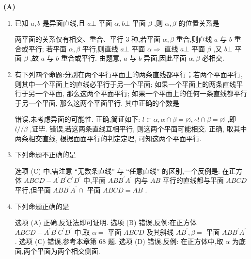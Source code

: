 \begin{center}  \textbf{(A)} \end{center}
\begin{enumerate}
    \item 已知 $a,b$ 是异面直线,且 $a\bot$ 平面 $\alpha ,b\bot$ 平面 $\beta$ ,则 $\alpha ,\beta$ 的位置关系是
    \begin{jieda}
        两平面的关系仅有相交、重合、平行 3 种,若平面 $\alpha ,\beta$ 重合,则直线 $a$ 与 $b$ 重合或平行; 若平面 $\alpha ,\beta$ 平行,则直线 $a \bot$ 平面 $\alpha  \Longrightarrow$ 直线 $a \bot$ 平面 $\beta$ ,又 $b \bot$ 平面 $\beta$ ,故 $a$ 与 $b$ 重合或平行. 由题意, $a$ 与 $b$ 异面,因此平面 $\alpha ,\beta$ 必相交.
    \end{jieda}
    
    \item 有下列四个命题:分别在两个平行平面上的两条直线都平行；若两个平面平行,则其中一个平面上的直线必平行于另一个平面;  如果一个平面上的两条直线平行于另一个平面, 那么这两个平面平行; 如果一个平面上的任何一条直线都平行于另一个平面, 那么这两个平面平行. 其中正确的个数是
    \begin{jieda}
        错误,未考虑异面的可能性. 正确,简证如下: $l \subset  \alpha ,\alpha  \cap  \beta  = \varnothing ,\therefore l \cap  \beta  = \varnothing$ ,即 $l//\beta$ ,证毕. 错误,若这两条直线互相平行, 则这两个平面可能相交. 正确, 取其中两条相交直线, 根据面面平行的判定定理, 可知这两个平面平行.
    \end{jieda}
    
    \item 下列命题不正确的是
    \begin{jieda}
        选项 (C) 中,需注意 “无数条直线” 与 “任意直线” 的区别,一个反例是: 在正方体 ${ABCD} - {A}^{\prime }{B}^{\prime }{C}^{\prime }{D}^{\prime }$ 中,平面 ${AB}{B}^{\prime }{A}^{\prime }$ 内与 ${AB}$ 平行的直线都与平面 ${ABCD}$ 平行,但平面 ${AB}{B}^{\prime }{A}^{\prime } \cap$ 平面 ${ABCD} = {AB}$ .
    \end{jieda}

    \item 下列命题正确的是
    \begin{jieda}
        选项 (A) 正确,反证法即可证明. 选项 (B) 错误,反例:在正方体 ${ABCD} - {A}^{\prime }{B}^{\prime }{C}^{\prime }{D}^{\prime }$ 中,取 $\alpha  =$ 平面 ${ABCD}$ 及其斜线 $A{B}^{\prime },\beta  =$ 平面 ${AB}{B}^{\prime }{A}^{\prime }$ . 选项 (C) 错误,参考本章第 68 题. 选项 (D) 错误,反例: 在正方体中,取 $\alpha$ 为底面,两个平面为两个相交侧面.
    \end{jieda}


\end{enumerate}
